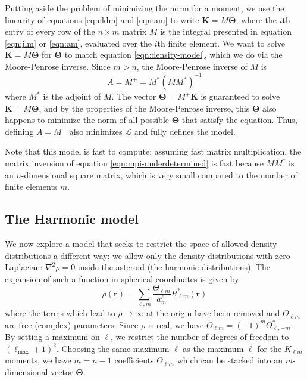 \documentclass[fleqn,usenatbib]{mnras}
\begin{document}
Putting aside the problem of minimizing the norm for a moment, we use the linearity of equations \ref{eqn:klm} and \ref{eqn:am} to write $\bm K = M \bm \Theta$, where the $i$th entry of every row of the $n\times m$ matrix $M$ is the integral presented in equation \ref{eqn:jlm} or \ref{eqn:am}, evaluated over the $i$th finite element. We want to solve $\bm K = M \bm \Theta$ for $\bm \Theta$ to match equation \ref{eqn:density-model}, which we do via the Moore-Penrose inverse. Since $m>n$, the Moore-Penrose inverse of $M$ is
\begin{equation}
  A=M^+ = M^*(MM^*)^{-1}
  \label{eqn:mpi-underdetermined}
\end{equation}
where $M^*$ is the adjoint of $M$. The vector $\bm \Theta=M^+\bm K$ is guaranteed to solve $\bm K = M \bm \Theta$, and by the properties of the Moore-Penrose inverse, this $\bm \Theta$ also happens to minimize the norm of all possible $\bm \Theta$ that satisfy the equation. Thus, defining $A=M^+$ also minimizes $\mathcal{L}$ and fully defines the model.

Note that this model is fast to compute; assuming fast matrix multiplication, the matrix inversion of equation \ref{eqn:mpi-underdetermined} is fast because $MM^*$ is an $n$-dimensional square matrix, which is very small compared to the number of finite elements $m$.




\subsection{The Harmonic model}
\label{sec:harmonic}

We now explore a model that seeks to restrict the space of allowed density distributions a different way: we allow only the density distributions with zero Laplacian: $\nabla^2 \rho = 0$ inside the asteroid (the harmonic distributions). The expansion of such a function in spherical coordinates is given by 
\begin{equation}
  \rho(\bm r) = \sum_{\ell, m} \frac{\Theta_{\ell m}}{a_m^\ell} R_{\ell m}^*(\bm r)
  \label{eqn:harmonic-rho}
\end{equation}
where the terms which lead to $\rho \rightarrow \infty$ at the origin have been removed and $\Theta_{\ell m}$ are free (complex) parameters. Since $\rho$ is real, we have $\Theta_{\ell m}=(-1)^m \Theta_{\ell,-m}^*$. By setting a maximum on $\ell$, we restrict the number of degrees of freedom to $(\ell_\mathrm{max}+ 1)^2$. Choosing the same maximum $\ell$ as the maximum $\ell$ for the $K_{\ell m}$ moments, we have $m=n-1$ coefficients $\Theta_{\ell m}$ which can be stacked into an $m$-dimensional vector $\bm \Theta$.
\end{document}
